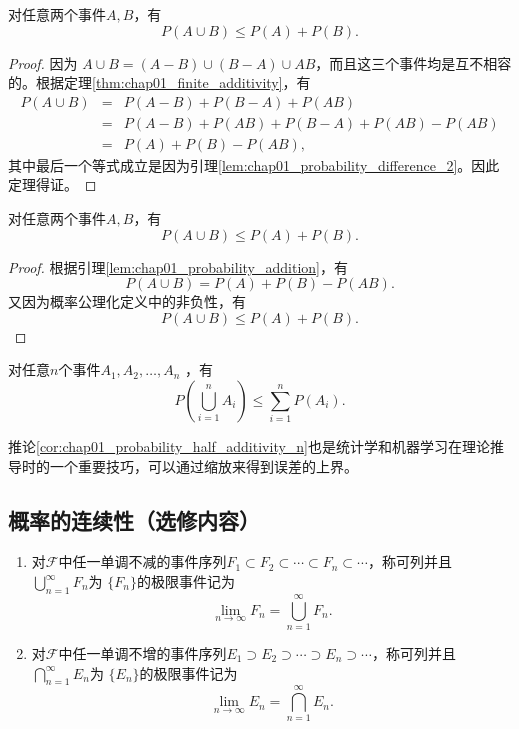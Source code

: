 \begin{lemma}\label{lem:chap01_probability_addition}
    对任意两个事件$A,B$，有$$P(A\cup B)\leq P(A)+P(B).$$
\end{lemma}
\begin{proof}
    因为 $A\cup B = (A-B) \cup (B-A) \cup AB$，而且这三个事件均是互不相容的。根据定理\ref{thm:chap01_finite_additivity}，有
    \begin{eqnarray*}
        P(A\cup B) &=& P(A-B) + P(B-A) + P(AB)\\
        &=& P(A-B) + P(AB) + P(B-A) + P(AB) - P(AB)\\
        &=& P(A) + P(B) - P(AB),
    \end{eqnarray*}
    其中最后一个等式成立是因为引理\ref{lem:chap01_probability_difference_2}。因此定理得证。
\end{proof}
\begin{theorem}[概率的半可加性]
    对任意两个事件$A,B$，有$$P(A\cup B)\leq P(A)+P(B).$$
\end{theorem}
 \begin{proof}
 根据引理\ref{lem:chap01_probability_addition}，有
 $$
 P(A\cup B) = P(A) + P(B) - P(AB).
$$
又因为概率公理化定义中的非负性，有
$$P(A\cup B)\leq P(A)+P(B).$$
 \end{proof}
 \begin{corollary}\label{cor:chap01_probability_half_additivity_n}
     对任意$n$个事件$A_{1} ,A_{2} ,\dots ,A_{n} $ ，有$$P(\bigcup_{i=1}^{n}A_{i}  )\le \sum_{i=1}^{n } P(A_{i} ).$$
 \end{corollary}
  \begin{remark}
      推论\ref{cor:chap01_probability_half_additivity_n}也是统计学和机器学习在理论推导时的一个重要技巧，可以通过缩放来得到误差的上界。
  \end{remark}
\subsection{概率的连续性（选修内容）}
 \begin{definition}[极限事件] \label{def:limit event} 
  \begin{enumerate}
      \item 对$\mathcal{F}$中任一单调不减的事件序列$F_{1} \subset F_{2}\subset \cdots \subset F_{n}\subset \cdots $，称可列并且 $\bigcup_{n=1}^{\infty } F_{n}$为 $\{F_{n}\}$的极限事件记为$$\lim_{n \to \infty} F_{n} =\bigcup_{n=1}^{\infty } F_{n}. $$
      \item 对$\mathcal{F}$中任一单调不增的事件序列$E_{1} \supset E_{2}\supset \cdots \supset E_{n}\supset \cdots $，称可列并且 $\bigcap_{n=1}^{\infty } E_{n}$为 $\{E_{n}\}$的极限事件记为$$\lim_{n \to \infty} E_{n} =\bigcap_{n=1}^{\infty } E_{n}. $$
  \end{enumerate}
  \end{definition}
  
